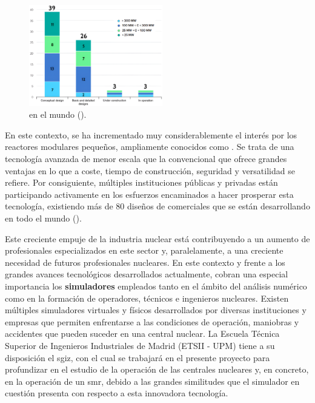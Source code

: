     \begin{figure}
      \vspace{-0.5cm}
      \centering
      \includegraphics[width=0.52\textwidth]{content/figures/global_smr_projects2.png}
      \caption{ en el mundo (\cite{iea_global_smr_projects}).}
      \label{fig:global_smr_projects}
      \vspace{-1cm}
    \end{figure}

    En este contexto, se ha incrementado muy considerablemente el interés por los reactores modulares pequeños, ampliamente conocidos como \emph{}. Se trata de una tecnología avanzada de menor escala que la convencional que ofrece grandes ventajas en lo que a coste, tiempo de construcción, seguridad y versatilidad se refiere. Por consiguiente, múltiples instituciones públicas y privadas están participando activamente en los esfuerzos encaminados a hacer prosperar esta tecnología, existiendo más de 80 diseños de  comerciales que se están desarrollando en todo el mundo (\cite{smr_oiea}).




    
\newpage 

Este creciente empuje de la industria nuclear está contribuyendo a un aumento de profesionales especializados en este sector y, paralelamente, a una creciente necesidad de futuros profesionales nucleares. En este contexto y frente a los grandes avances tecnológicos desarrollados actualmente, cobran una especial importancia los \textbf{simuladores} empleados tanto en el ámbito del análisis numérico como en la formación de operadores, técnicos e ingenieros nucleares. Existen múltiples simuladores virtuales y físicos desarrollados por diversas instituciones y empresas que permiten enfrentarse a las condiciones de operación, maniobras y accidentes que pueden suceder en una central nuclear. La Escuela Técnica Superior de Ingenieros Industriales de Madrid (ETSII - UPM) tiene a su disposición el \acrfull{sgiz}, con el cual se trabajará en el presente proyecto para profundizar en el estudio de la operación de las centrales nucleares y, en concreto, en la operación de un \acrshort{smr}, debido a las grandes similitudes que el simulador en cuestión presenta con respecto a esta innovadora tecnología.

